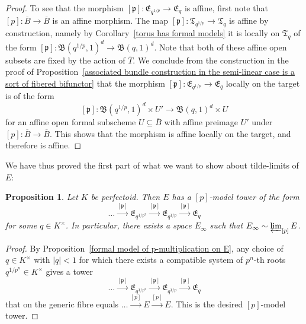 \documentclass[10pt,oneside]{amsart}
\newtheorem{proposition}[theorem]{Proposition}
\theoremstyle{definition}
\theoremstyle{remark}
\begin{document}
\begin{proof}
		To see that the morphism $[\mathfrak p]:\mathfrak E_{q^{1/p}} \rightarrow  \mathfrak E_{q}$ is affine, first note that $[p]:\overline{B}\rightarrow \overline{B}$ is an affine morphism. The map $[\mathfrak p]:\mathfrak T_{q^{1/p}}\rightarrow \mathfrak T_{q}$ is affine by construction, namely by Corollary~\ref{torus has formal models} it is locally on $\mathfrak T_{q}$ of the form $[\mathfrak p]:\mathfrak B(q^{1/p},1)^d\rightarrow \mathfrak B(q,1)^d$. Note that both of these affine open subsets are fixed by the action of $\overline{T}$.
		We conclude from the construction in the proof of Proposition~\ref{associated bundle construction in the semi-linear case is a sort of fibered bifunctor} that the morphism  $[\mathfrak p]:\mathfrak E_{q^{1/p}} \rightarrow  \mathfrak E_{q}$ locally on the target is of the form
		\[[\mathfrak p]:\mathfrak B(q^{1/p},1)^d \times U' \rightarrow \mathfrak B(q,1)^d \times U\]
		for an affine open formal subscheme $U\subseteq \overline{B}$ with affine preimage $U'$ under $[p]:\overline{B}\rightarrow \overline{B}$. This shows that the morphism is affine locally on the target, and therefore is affine.
	\end{proof}
	
	We have thus proved the first part of what we want to show about tilde-limits of $E$:
	\begin{proposition}\label{p-model tower exists for E}
		Let $K$ be perfectoid. Then $E$ has a $[p]$-model tower of the form
		\[\dots \xrightarrow{[\mathfrak p]} \mathfrak E_{q^{1/p^2}}\xrightarrow{[\mathfrak p]} \mathfrak E_{q^{1/p}}\xrightarrow{[\mathfrak p]} \mathfrak E_q\]
		for some $q\in K^\times$. In particular, there exists a space $E_\infty$ such that $E_\infty\sim \varprojlim_{[p]}E$.
	\end{proposition}
	\begin{proof}
		By Proposition~\ref{formal model of p-multiplication on E}, any choice of $q\in K^\times$ with $|q|<1$ for which there exists a compatible system of $p^n$-th roots $q^{1/p^n}\in K^\times$ gives a tower
		\[\dots \xrightarrow{[\mathfrak p]} \mathfrak E_{q^{1/p^2}}\xrightarrow{[\mathfrak p]} \mathfrak E_{q^{1/p}}\xrightarrow{[\mathfrak p]} \mathfrak E_q\]
		that on the generic fibre equals $\dots\xrightarrow{[p]} E\xrightarrow{[p]} E$. This is the desired $[p]$-model tower.
	\end{proof}
	
\end{document}
